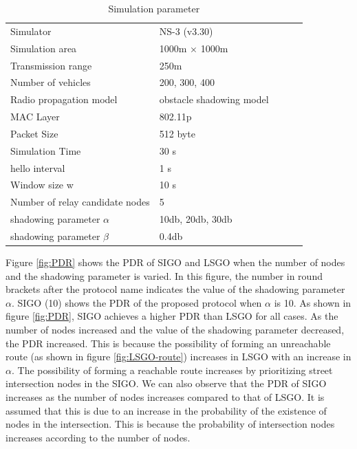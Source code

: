 \documentclass[conference]{IEEEtran}
\begin{document}
\begin{table}[!ht]
\begin{center}
\caption{Simulation parameter}
\label{tab:parameter}
\begin{tabular}{|l|l|lll}
\cline{1-2}
Simulator    & NS-3 (v3.30) &  &  &  \\ \cline{1-2}
Simulation area    & 1000m × 1000m   &  &  &  \\ \cline{1-2}
Transmission range & 250m            &  &  &  \\ \cline{1-2}
Number of vehicles & 200, 300, 400      &  &  &  \\ \cline{1-2}
Radio propagation model    & obstacle shadowing model\cite{20}&  &  &  \\ \cline{1-2}
MAC Layer     & 802.11p &  &  &  \\ \cline{1-2}
Packet Size & 512 byte       &  &  &  \\ \cline{1-2}
Simulation Time & 30 s      &  &  &  \\ \cline{1-2}
hello interval & 1 s      &  &  &  \\ \cline{1-2}
Window size w  & 10 s      &  &  &  \\ \cline{1-2}
Number of relay candidate nodes  & 5       &  &  \\ \cline{1-2}
shadowing parameter $\alpha$  & 10db, 20db, 30db       &  &  &  \\ \cline{1-2}
shadowing parameter $\beta$    & 0.4db &  &  \\ \cline{1-2}
\end{tabular}
\end{center}
\end{table}




Figure \ref{fig:PDR} shows the PDR of SIGO and LSGO when the number of nodes and the shadowing parameter is varied. 
In this figure, the number in round brackets after the protocol name indicates the value of the shadowing parameter $\alpha$. SIGO (10) shows the PDR of the proposed protocol when $\alpha$ is 10.
As shown in figure \ref{fig:PDR}, SIGO achieves a higher PDR than LSGO for all cases. 
As the number of nodes increased and the value of the shadowing parameter decreased, the PDR increased. This is because the possibility of forming an unreachable route (as shown in figure \ref{fig:LSGO-route}) increases in LSGO with an increase in $\alpha$. The possibility of forming a reachable route increases by prioritizing street intersection nodes in the SIGO.
We can also observe that the PDR of SIGO increases as the number of nodes increases compared to that of LSGO. It is assumed that this is due to an increase in the probability of the existence of nodes in the intersection. 
This  is because the probability of intersection nodes increases according to the number of nodes.
\end{document}
